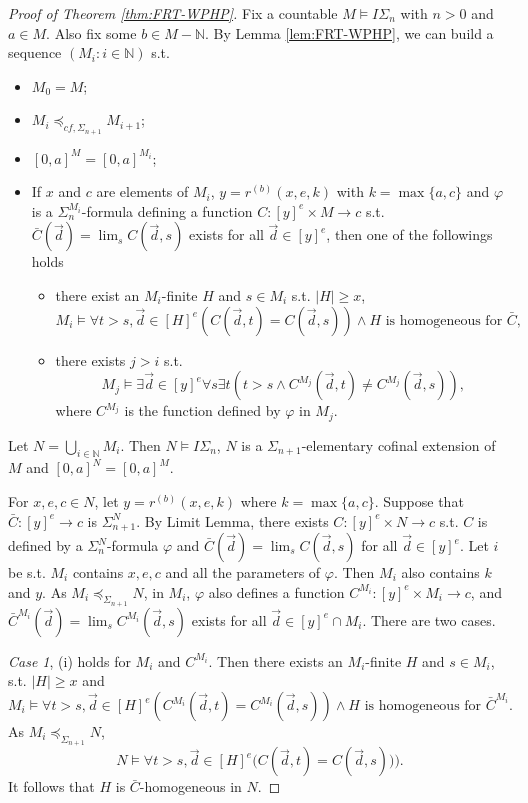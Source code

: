 \documentclass[twoside,a4paper]{amsart}
\theoremstyle{definition}
\theoremstyle{theorem}
\numberwithin{equation}{section}
\newcommand{\<}{\langle}
\renewcommand{\>}{\rangle}
\begin{document}
\begin{proof}[Proof of Theorem \ref{thm:FRT-WPHP}]
Fix a countable $M \models I\Sigma_n$ with $n > 0$ and $a \in M$.
Also fix some $b \in M - \mathbb{N}$.
By Lemma \ref{lem:FRT-WPHP}, we can build a sequence $(M_i: i \in \mathbb{N})$ s.t.
\begin{itemize}
 \item $M_0 = M$;
 \item $M_i \preceq_{cf,\Sigma_{n+1}} M_{i+1}$;
 \item $[0,a]^M = [0,a]^{M_i}$;
 \item If $x$ and $c$ are elements of $M_i$, 
 $y = r^{(b)}(x,e,k)$ with $k = \max\{a,c\}$ and
 $\varphi$ is a $\Sigma_n^{M_i}$-formula defining a function $C: [y]^e \times M \to c$ 
 s.t. $\bar{C}(\vec{d}) = \lim_s C(\vec{d},s)$ exists for all $\vec{d} \in [y]^e$,
 then one of the followings holds
 \begin{itemize}
  \item[(i)] there exist an $M_i$-finite $H$ and $s \in M_i$ s.t. $|H| \geq x$,
  \[
    M_i \models \forall t > s,\vec{d} \in [H]^e (C(\vec{d},t) = C(\vec{d},s)) \wedge H \text{ is homogeneous for } \bar{C},
  \]
  \item[(ii)] there exists $j > i$ s.t.
  \[
    M_j \models \exists \vec{d} \in [y]^e \forall s \exists t (t > s \wedge C^{M_j}(\vec{d},t) \neq C^{M_j}(\vec{d},s)),
  \]
  where $C^{M_j}$ is the function defined by $\varphi$ in $M_j$.
 \end{itemize}
\end{itemize}
Let $N = \bigcup_{i \in \mathbb{N}} M_i$.
Then $N \models I\Sigma_n$, $N$ is a $\Sigma_{n+1}$-elementary cofinal extension of $M$ and $[0,a]^N = [0,a]^M$.

For $x,e,c \in N$, let $y = r^{(b)}(x,e,k)$ where $k = \max\{a,c\}$.
Suppose that $\bar{C}: [y]^e \to c$ is $\Sigma_{n+1}^N$.
By Limit Lemma, there exists $C: [y]^e \times N \to c$
 s.t. $C$ is defined by a $\Sigma_n^N$-formula $\varphi$ and $\bar{C}(\vec{d}) = \lim_s C(\vec{d},s)$ for all $\vec{d} \in [y]^e$.
Let $i$ be s.t. $M_i$ contains $x,e,c$ and all the parameters of $\varphi$.
Then $M_i$ also contains $k$ and $y$.
As $M_i \preceq_{\Sigma_{n+1}} N$, in $M_i$, $\varphi$ also defines a function $C^{M_i}: [y]^e \times M_i \to c$,
and $\bar{C}^{M_i}(\vec{d}) = \lim_s C^{M_i}(\vec{d},s)$ exists for all $\vec{d} \in [y]^e \cap M_i$.
There are two cases.

\emph{Case 1}, (i) holds for $M_i$ and $C^{M_i}$.
Then there exists an $M_i$-finite $H$ and $s \in M_i$, s.t. $|H| \geq x$ and
\[
  M_i \models \forall t > s,\vec{d} \in [H]^e (C^{M_i}(\vec{d},t) = C^{M_i}(\vec{d},s)) \wedge H \text{ is homogeneous for } \bar{C}^{M_i}.
\]
As $M_i \preceq_{\Sigma_{n+1}} N$,
\[
  N \models \forall t > s,\vec{d} \in [H]^e \big( C(\vec{d},t) = C(\vec{d},s)) \big).
\]
It follows that $H$ is $\bar{C}$-homogeneous in $N$.


\end{proof}
\end{document}
